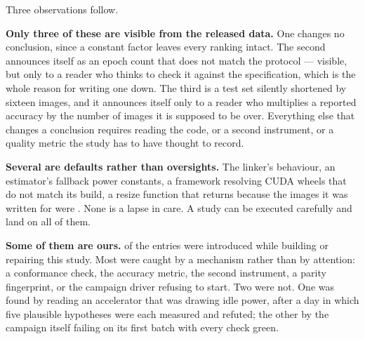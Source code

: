 Three observations follow.

\textbf{Only three of these are visible from the released data.} One changes no
conclusion, since a constant factor leaves every ranking intact. The second
announces itself as an epoch count that does not match the protocol --- visible,
but only to a reader who thinks to check it against the specification, which is
the whole reason for writing one down. The third is a test set silently shortened
by sixteen images, and it announces itself only to a reader who multiplies a
reported accuracy by the number of images it is supposed to be over. Everything
else that changes a conclusion requires reading the code, or a second instrument,
or a quality metric the study has to have thought to record.

\textbf{Several are defaults rather than oversights.} The linker's
 behaviour, an estimator's fallback power constants, a
framework resolving CUDA wheels that do not match its build, a resize function
that returns  because the images it was written for were
. None is a lapse in care. A study can be executed carefully and
land on all of them.

\textbf{Some of them are ours.} \vDefectOurs{} of the \vDefectCount{} entries
were introduced while building or repairing this study. Most were caught by a
mechanism rather than by attention: a conformance check, the accuracy metric, the
second instrument, a parity fingerprint, or the campaign driver refusing to
start. Two were not. One was found by reading an accelerator that was drawing
idle power, after a day in which five plausible hypotheses were each measured and
refuted; the other by the campaign itself failing on its first batch with every
check green.

